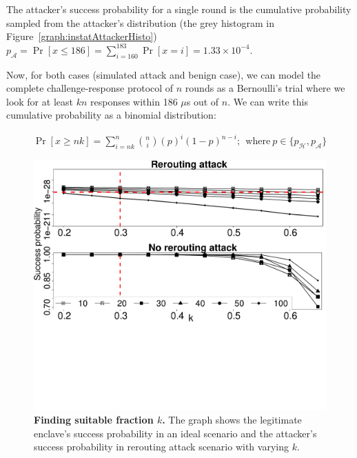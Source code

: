 The attacker's success probability for a single round is the cumulative probability sampled from the attacker's distribution (the grey histogram in Figure~\ref{graph:instatAttackerHisto}) $p_\mathcal{A} = \Pr[x \leq 186] = \sum_{i=160}^{183}\Pr[x=i] = 1.33 \times 10^{-4}$.


Now, for both cases (simulated attack and benign case), we can model the complete challenge-response protocol of $n$ rounds as a Bernoulli's trial where we look for at least $kn$ responses within 186 $\mu$s out of $n$. We can write this cumulative probability as a binomial distribution:
%

\begin{align*}
    \Pr[x \geq nk] = \sum_{i=nk}^n\binom{n}{i} (p)^{i}(1-p)^{n-i};~~\text{where}~ p \in \{p_\mathcal{H}, p_\mathcal{A}\}
\end{align*}

\begin{figure}[t]
  \centering
    \includegraphics[trim={0 10cm 0 0}, clip, width=\linewidth]{chapters/ProximiTEE/data/fx3_data/round_comp_new.pdf}
    \caption[Finding suitable fraction $k$]{\textbf{Finding suitable fraction $k$.} The graph shows the legitimate enclave's success probability in an ideal scenario and the attacker's success probability in rerouting attack scenario with varying $k$.}
    \label{graph:roundSuccess}
\end{figure}




